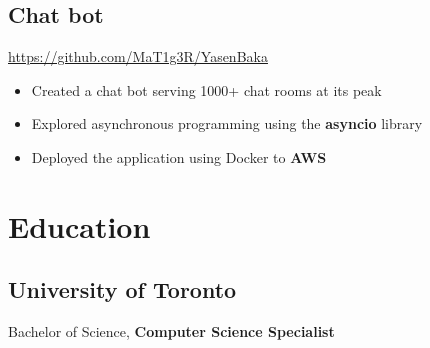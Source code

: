 \documentclass[letterpaper,12pt,oneside]{article}
\newcommand{\smallurl}[1]{\footnotesize{\url{#1}}\normalsize}
\begin{document}
\subsection*{Chat bot \hfill {}}
\smallurl{https://github.com/MaT1g3R/YasenBaka}
\begin{itemize}
    \setlength\itemsep{0em}
    \item Created a chat bot serving 1000+ chat rooms at its peak
    \item Explored asynchronous programming using the \textbf{asyncio} library
    \item Deployed the application using Docker to \textbf{AWS}
\end{itemize}

\section*{Education}
\subsection*{University of Toronto \hfill {}}
Bachelor of Science, \textbf{Computer Science Specialist}
\end{document}
